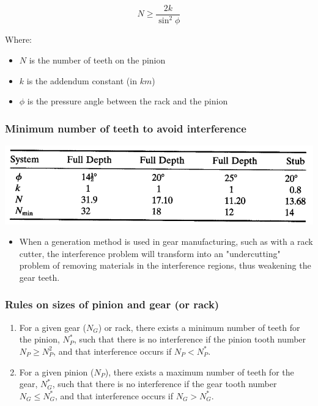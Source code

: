 \documentclass[11pt]{article}
\begin{document}
\[N \ge \frac{2k}{\sin^2 \phi}\]

Where:
\begin{itemize}
\item \(N\) is the number of teeth on the pinion
\item \(k\) is the addendum constant (in \(\unit{km}\))
\item \(\phi\) is the pressure angle between the rack and the pinion
\end{itemize}
\subsubsection{Minimum number of teeth to avoid interference}
\label{sec:org572d71b}
\begin{center}
\includegraphics[width=.9\linewidth]{./images/minimum-number-of-teeth-to-avoid-interference-table.png}
\end{center}
\begin{itemize}
\item When a generation method is used in gear manufacturing, such as with a rack cutter, the interference problem will transform into an "undercutting" problem of removing materials in the interference regions, thus weakening the gear teeth.
\end{itemize}
\subsubsection{Rules on sizes of pinion and gear (or rack)}
\label{sec:org16c369b}
\begin{enumerate}
\item For a given gear (\(N_G\)) or rack, there exists a minimum number of teeth for the pinion, \(N_P^*\), such that there is no interference if the pinion tooth number \(N_P \ge N_P^2\), and that interference occurs if \(N_P < N_P^*\).
\item For a given pinion (\(N_P\)), there exists a maximum number of teeth for the gear, \(N_G^*\), such that there is no interference if the gear tooth number \(N_G \le N_G^*\), and that interference occurs if \(N_G > N_G^*\).
\end{enumerate}
\end{document}
